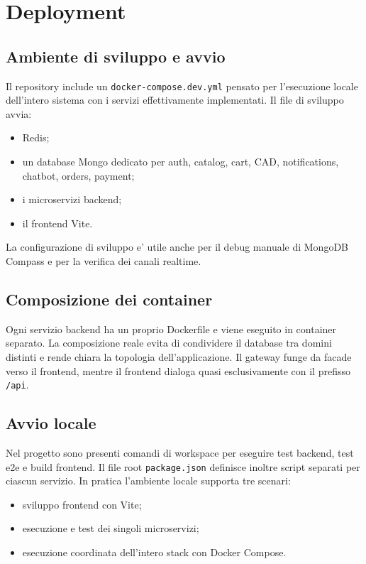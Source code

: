 \chapter{Deployment}

\section{Ambiente di sviluppo e avvio}

Il repository include un \texttt{docker-compose.dev.yml} pensato per l'esecuzione locale dell'intero sistema con i servizi effettivamente implementati. Il file di sviluppo avvia:

\begin{itemize}
\item Redis;
\item un database Mongo dedicato per auth, catalog, cart, CAD, notifications, chatbot, orders, payment;
\item i microservizi backend;
\item il frontend Vite.
\end{itemize}

La configurazione di sviluppo e' utile anche per il debug manuale di MongoDB Compass e per la verifica dei canali realtime.

\section{Composizione dei container}

Ogni servizio backend ha un proprio Dockerfile e viene eseguito in container separato. La composizione reale evita di condividere il database tra domini distinti e rende chiara la topologia dell'applicazione. Il gateway funge da facade verso il frontend, mentre il frontend dialoga quasi esclusivamente con il prefisso \texttt{/api}.

\section{Avvio locale}

Nel progetto sono presenti comandi di workspace per eseguire test backend, test e2e e build frontend. Il file root \texttt{package.json} definisce inoltre script separati per ciascun servizio. In pratica l'ambiente locale supporta tre scenari:

\begin{itemize}
\item sviluppo frontend con Vite;
\item esecuzione e test dei singoli microservizi;
\item esecuzione coordinata dell'intero stack con Docker Compose.
\end{itemize}

